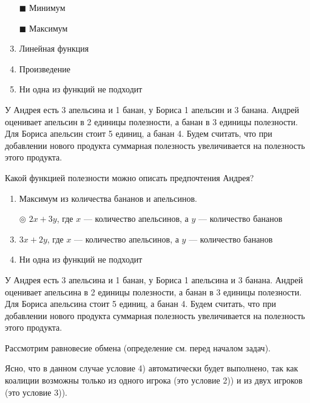 \begin{enumerate}[label=$\square$]
	
	\item[$\blacksquare$] Минимум
	\item[$\blacksquare$] Максимум
	\item Линейная функция
	\item Произведение
	\item Ни одна из функций не подходит
\end{enumerate}

\task
У Андрея есть 3 апельсина и 1 банан, у Бориса 1 апельсин и 3 банана. Андрей оценивает апельсин в 2 единицы полезности, а банан в 3 единицы полезности. Для Бориса апельсин стоит 5 единиц, а банан 4. Будем считать, что при добавлении нового продукта суммарная полезность увеличивается на полезность этого продукта.

Какой функцией полезности можно описать предпочтения Андрея?

\begin{enumerate}[label=$\circ$]	%
	\item Максимум из количества бананов и апельсинов.
	\item[$\circledcirc$] $2x+3y$, где $x$ --- количество апельсинов, а $y$ --- количество бананов
	\item $3 x + 2y$, где $x$ --- количество апельсинов, а $y$ --- количество бананов
	\item Ни одна из функций не подходит
\end{enumerate}

\task
У Андрея есть 3 апельсина и 1 банан, у Бориса 1 апельсина и 3 банана. Андрей оценивает апельсина в 2 единицы полезности, а банан в 3 единицы полезности. Для Бориса апельсина стоит 5 единиц, а банан 4. Будем считать, что при добавлении нового продукта суммарная полезность увеличивается на полезность этого продукта.

Рассмотрим равновесие обмена (определение см. перед началом задач).

Ясно, что в данном случае условие 4) автоматически будет выполнено, так как коалиции возможны только из одного игрока (это условие 2)) и из двух игроков (это условие 3)).

